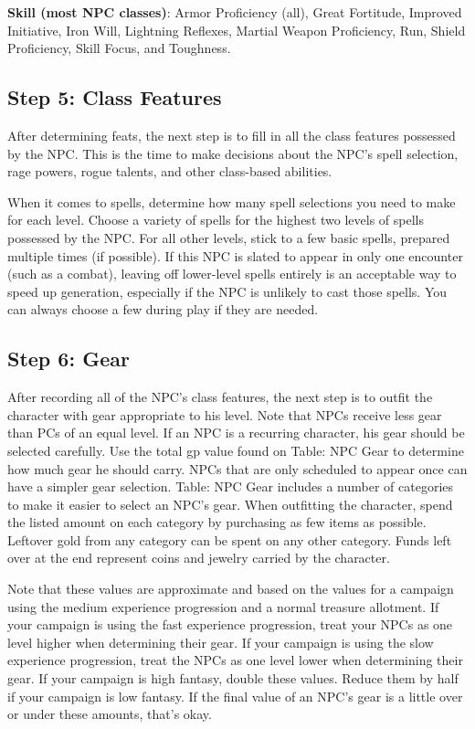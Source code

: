 \textbf{Skill (most NPC classes)}: Armor Proficiency (all), Great Fortitude, Improved Initiative, Iron Will, Lightning Reflexes, Martial Weapon Proficiency, Run, Shield Proficiency, Skill Focus, and Toughness.
				
\subsection{Step 5: Class Features}

				
After determining feats, the next step is to fill in all the class features possessed by the NPC. This is the time to make decisions about the NPC's spell selection, rage powers, rogue talents, and other class-based abilities. 
				
When it comes to spells, determine how many spell selections you need to make for each level. Choose a variety of spells for the highest two levels of spells possessed by the NPC. For all other levels, stick to a few basic spells, prepared multiple times (if possible). If this NPC is slated to appear in only one encounter (such as a combat), leaving off lower-level spells entirely is an acceptable way to speed up generation, especially if the NPC is unlikely to cast those spells. You can always choose a few during play if they are needed.
				
\subsection{Step 6: Gear}

				
After recording all of the NPC's class features, the next step is to outfit the character with gear appropriate to his level. Note that NPCs receive less gear than PCs of an equal level. If an NPC is a recurring character, his gear should be selected carefully. Use the total gp value found on Table: NPC Gear to determine how much gear he should carry. NPCs that are only scheduled to appear once can have a simpler gear selection. Table: NPC Gear includes a number of categories to make it easier to select an NPC's gear. When outfitting the character, spend the listed amount on each category by purchasing as few items as possible. Leftover gold from any category can be spent on any other category. Funds left over at the end represent coins and jewelry carried by the character.
				
Note that these values are approximate and based on the values for a campaign using the medium experience progression and a normal treasure allotment. If your campaign is using the fast experience progression, treat your NPCs as one level higher when determining their gear. If your campaign is using the slow experience progression, treat the NPCs as one level lower when determining their gear. If your campaign is high fantasy, double these values. Reduce them by half if your campaign is low fantasy. If the final value of an NPC's gear is a little over or under these amounts, that's okay.
					

